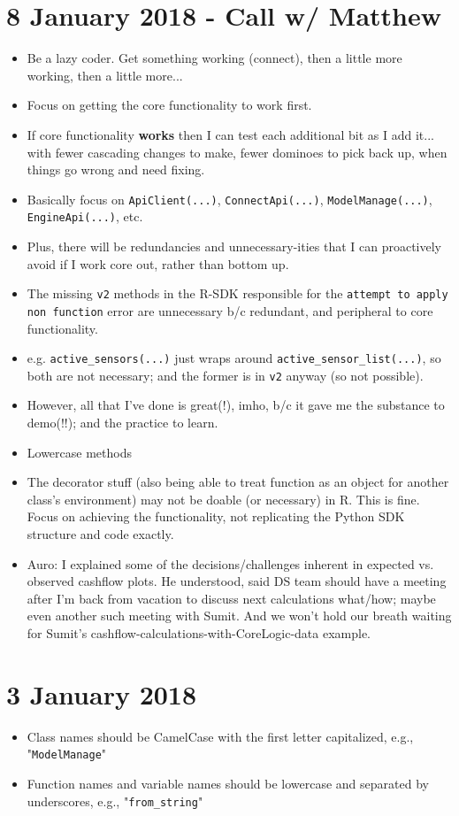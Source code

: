 \documentclass{article}
\begin{document}
\section*{8 January 2018 - Call w/ Matthew}
\begin{itemize}
\item Be a lazy coder. Get something working (connect), then a little more working, then a little more...
\item Focus on getting the core functionality to work first.
\item If core functionality {\bf works} then I can test each additional bit as I add it... with fewer cascading changes to make, fewer dominoes to pick back up, when things go wrong and need fixing.
\item Basically focus on \verb|ApiClient(...)|, \verb|ConnectApi(...)|, \verb|ModelManage(...)|, \verb|EngineApi(...)|, etc.
\item Plus, there will be redundancies and unnecessary-ities that I can proactively avoid if I work core out, rather than bottom up.
\item The missing \verb|v2| methods in the R-SDK responsible for the \verb|attempt to apply non function| error are unnecessary b/c redundant, and peripheral to core functionality.
\item e.g. \verb|active_sensors(...)| just wraps around \verb|active_sensor_list(...)|, so both are not necessary; and the former is in \verb|v2| anyway (so not possible).
\item However, all that I've done is great(!), imho, b/c it gave me the substance to demo(!!); and the practice to learn.
\item Lowercase methods
\item The decorator stuff (also being able to treat function as an object for another class's environment) may not be doable (or necessary) in R. This is fine. Focus on achieving the functionality, not replicating the Python SDK structure and code exactly.
\item Auro: I explained some of the decisions/challenges inherent in expected vs. observed cashflow plots. He understood, said DS team should have a meeting after I'm back from vacation to discuss next calculations what/how; maybe even another such meeting with Sumit. And we won't hold our breath waiting for Sumit's cashflow-calculations-with-CoreLogic-data example.
\end{itemize}


\section*{3 January 2018}
\begin{itemize}
\item Class names should be CamelCase with the first letter capitalized, e.g., "\verb|ModelManage|"
\item Function names and variable names should be lowercase and separated by underscores, e.g., "\verb|from_string|"
\end{itemize}
\end{document}
